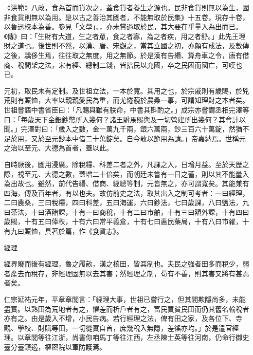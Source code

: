 
\begin{pinyinscope}

 《洪範》八政，食為首而貨次之，蓋食貨者養生之源也。民非食貨則無以為生，國非食貨則無以為用。是以古之善治其國者，不能無取於民集》十五卷，現存十卷，以魯迅校本為善。參見「文學」、，亦未嘗過取於民，其大要在乎量入為出而已。《傳》曰：「生財有大道，生之者眾，食之者寡，為之者疾，用之者舒。」此先王理財之道也。後世則不然，以漢、唐、宋觀之，當其立國之初，亦頗有成法，及數傳之後，驕侈生焉，往往取之無度，用之無節。於是漢有告緡、算舟車之令，唐有借商、稅間架之法，宋有經、總制二錢，皆掊民以充國，卒之民困而國亡，可嘆也已。



 元初，取民未有定制。及世祖立法，一本於寬。其用之也，於宗戚則有歲賜，於兇荒則有賑恤，大率以親親愛民為重，而尤惓藐於農桑一事，可謂知理財之本者矣。世祖嘗語中書省臣曰：「凡賜與雖有朕命，中書其斟酌之。」成宗亦嘗謂丞相完澤等曰：「每歲天下金銀鈔幣所入幾何？諸王駙馬賜與及一切營建所出幾何？其會計以聞。」完澤對曰：「歲入之數，金一萬九千兩，銀六萬兩，鈔三百六十萬錠，然猶不足於用，又於至元鈔本中借二十萬錠矣。自今敢以節用為請。」帝嘉納焉。世稱元之治以至元、大德為首者，蓋以此。



 自時厥後，國用浸廣。除稅糧、科差二者之外，凡課之入，日增月益。至於天歷之際，視至元、大德之數，蓋增二十倍矣，而朝廷未嘗有一日之蓄，則以其不能量入為出故也。雖然，前代告緡、借商、經總等制，元皆無之，亦可謂寬矣。其能兼有四海，傳及百年者，有以也夫。故仿前史之法，取其出入之制可考者：一曰經理，二曰農桑，三曰稅糧，四曰科差，五曰海運，六曰鈔法，七曰歲課，八曰鹽法，九曰茶法，十曰酒醋課，十有一曰商稅，十有二曰市舶，十有三曰額外課，十有四曰歲賜，十有五曰俸秩，十有六曰常平義倉，十有七曰惠民藥局，十有八曰市糴，十有九曰賑恤，具著於篇，作《食貨志》。



 經理



 經界廢而後有經理，魯之履畝，漢之核田，皆其制也。夫民之強者田多而稅少，弱者產去而稅存，非經理固無以去其害；然經理之制，茍有不善，則其害又將有甚焉者矣。



 仁宗延祐元年，平章章閭言：「經理大事，世祖已嘗行之，但其間欺隱尚多，未能盡實。以熟田為荒地者有之，懼差而析戶者有之，富民買貧民田而仍其舊名輸稅者亦有之。由是歲入不增，小民告病。若行經理之法，俾有田之家，及各位下、寺觀、學校、財賦等田，一切從實自首，庶幾稅入無隱，差徭亦均。」於是遣官經理。以章閭等往江浙，尚書你咱馬丁等往江西，左丞陳士英等往河南，仍命行御史臺分臺鎮遏，樞密院以軍防護焉。




\end{pinyinscope}
